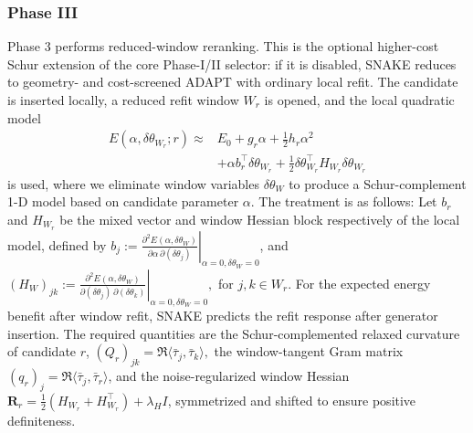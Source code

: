 \documentclass[
  reprint,
  amsmath,
  amssymb,
  aps,
  pra,
  nofootinbib,
  superscriptaddress,
  floatfix
]{revtex4-2}
\begin{document}
\subsubsection{Phase III}
Phase 3 performs reduced-window reranking.  This is the optional higher-cost Schur extension of the core Phase-I/II selector: if it is disabled, SNAKE reduces to geometry- and cost-screened ADAPT with ordinary local refit. The candidate is inserted locally, a reduced refit window $W_r$ is opened, and the local quadratic model
\begin{equation}
\begin{split}
E(\alpha,\delta\theta_{W_r};r)\approx{}&E_0+g_r\alpha+\frac12h_r\alpha^2 \\
&+\alpha b_r^{\top}\delta\theta_{W_r} +\frac12\delta\theta_{W_r}^{\top}H_{W_r}\delta\theta_{W_r}
\end{split}
\label{eq:local_quadratic}
\end{equation}
is used, where we eliminate window variables $\delta \theta_W$ to produce a Schur-complement 1-D model based on candidate parameter $\alpha$.
The treatment is as follows:
Let $b_r$ and $H_{W_r}$ be the mixed vector and window Hessian block respectively of the local model, defined by $b_j:=
\left.
\frac{\partial^2 E(\alpha,\delta\theta_W)}
{\partial\alpha\,\partial(\delta\theta_j)}
\right|_{\alpha=0,\delta\theta_W=0}$, and $(H_W)_{jk}:=
\left.
\frac{\partial^2 E(\alpha,\delta\theta_W)}
{\partial(\delta\theta_j)\,\partial(\delta\theta_k)}
\right|_{\alpha=0,\delta\theta_W=0},$ for $j,k\in W_r.$
For the expected energy benefit after window refit, SNAKE predicts the refit response after generator insertion. The required quantities are the Schur-complemented relaxed curvature of candidate $r$, $(Q_r)_{jk}=\Re\langle\bar\tau_j,\bar\tau_k\rangle,$ the window-tangent Gram matrix $(q_r)_j=\Re\langle\bar\tau_j,\bar\tau_r\rangle$, and the noise-regularized window Hessian $\mathbf R_r=\frac12(H_{W_r}+H_{W_r}^{\top})+\lambda_H I$, symmetrized and shifted to ensure positive definiteness.
\end{document}

